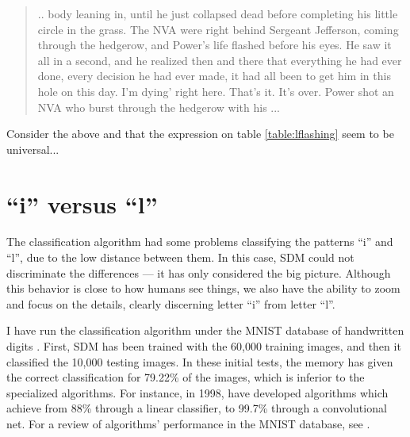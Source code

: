 %

\begin{quote}
.. body leaning in, until he just collapsed dead before completing his little circle in the grass. The NVA were right behind Sergeant Jefferson, coming through the hedgerow, and Power's life flashed before his eyes. He saw it all in a second, and he realized then and there that everything he had ever done, every decision he had ever made, it had all been to get him in this hole on this day. I'm dying' right here. That's it. It's over. Power shot an NVA who burst through the hedgerow with his ...
\end{quote}

Consider the above and that the expression on table \ref{table:lflashing} seem to be universal...


%



\section{``i'' versus ``l''}

The classification algorithm had some problems classifying the patterns ``i'' and ``l'', due to the low distance between them. In this case, SDM could not discriminate the differences --- it has only considered the big picture. Although this behavior is close to how humans see things, we also have the ability to zoom and focus on the details, clearly discerning letter ``i'' from letter ``l''.

I have run the classification algorithm under the MNIST database of handwritten digits \citep{deng2012mnist}. First, SDM has been trained with the 60,000 training images, and then it classified the 10,000 testing images. In these initial tests, the memory has given the correct classification for 79.22\% of the images, which is inferior to the specialized algorithms. For instance, in 1998, \citet{lecun1998gradient} have developed algorithms which achieve from 88\% through a linear classifier, to 99.7\% through a convolutional net. For a review of algorithms' performance in the MNIST database, see \cite{mnist}.

